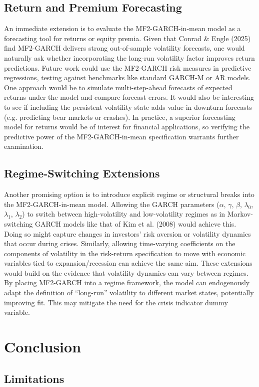 \documentclass[12pt]{article}
\begin{document}
\subsection{Return and Premium Forecasting}
An immediate extension is to evaluate the MF2-GARCH-in-mean model as a forecasting tool for returns or equity premia. Given that Conrad \& Engle (2025) find MF2-GARCH delivers strong out-of-sample volatility forecasts, one would naturally ask whether incorporating the long-run volatility factor improves return predictions. Future work could use the MF2-GARCH risk measures in predictive regressions, testing against benchmarks like standard GARCH-M or AR models. One approach would be to simulate multi-step-ahead forecasts of expected returns under the model and compare forecast errors. It would also be interesting to see if including the persistent volatility state adds value in downturn forecasts (e.g. predicting bear markets or crashes). In practice, a superior forecasting model for returns would be of interest for financial applications, so verifying the predictive power of the MF2-GARCH-in-mean specification warrants further examination.
\subsection{Regime-Switching Extensions}
Another promising option is to introduce explicit regime or structural breaks into the MF2-GARCH-in-mean model. Allowing the GARCH parameters ($\alpha$, $\gamma$, $\beta$, $\lambda_0$, $\lambda_1$, $\lambda_2$) to switch between high-volatility and low-volatility regimes as in Markov-switching GARCH models like that of Kim et al. (2008) would achieve this. Doing so might capture changes in investors' risk aversion or volatility dynamics that occur during crises. Similarly, allowing time-varying coefficients on the components of volatility in the risk-return specification to move with economic variables tied to expansion/recession can achieve the same aim. These extensions would build on the evidence that volatility dynamics can vary between regimes. By placing MF2-GARCH into a regime framework, the model can  endogenously adapt the definition of “long-run” volatility to different market states, potentially improving fit. This may mitigate the need for the crisis indicator dummy variable.

\section{Conclusion}
\subsection{Limitations}
\end{document}
